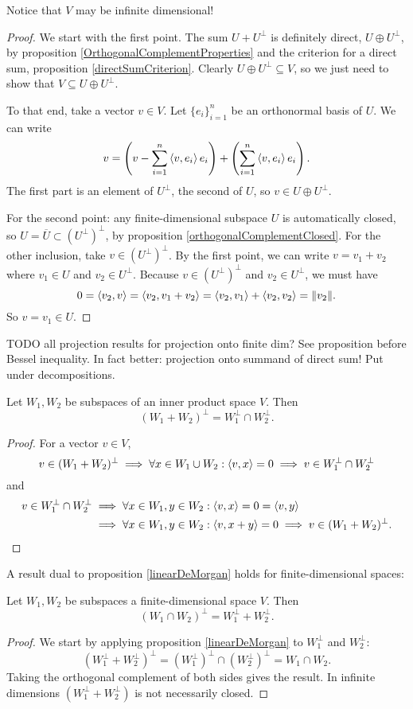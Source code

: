 Notice that $V$ may be infinite dimensional!
\begin{proof}
We start with the first point. The sum $U + U^\perp$ is definitely direct, $U\oplus U^\perp$, by proposition \ref{OrthogonalComplementProperties} and the criterion for a direct sum, proposition \ref{directSumCriterion}. Clearly $U\oplus U^\perp\subseteq V$, so we just need to show that $V \subseteq U\oplus U^\perp$.

To that end, take a vector $v\in V$. Let $\{e_i\}_{i=1}^n$ be an orthonormal basis of $U$. We can write
\[ v = \left(v - \sum_{i=1}^n\left\langle v,e_i \right\rangle e_i\right) + \left(\sum_{i=1}^n\left\langle v,e_i \right\rangle e_i\right). \]
The first part is an element of $U^\perp$, the second of $U$, so $v\in U\oplus U^\perp$.

For the second point: any finite-dimensional subspace $U$ is automatically closed, so $U = \overline{U} \subset (U^\perp)^\perp$, by proposition \ref{orthogonalComplementClosed}. For the other inclusion, take $v\in (U^\perp)^\perp$. By the first point, we can write $v = v_1 + v_2$ where $v_1\in U$ and $v_2\in U^\perp$. Because $v\in (U^\perp)^\perp$ and $v_2\in U^\perp$, we must have
\[ 0 = \left\langle v_2, v \right\rangle = \left\langle v_2, v_1+v_2 \right\rangle = \left\langle v_2, v_1 \right\rangle + \left\langle v_2,v_2 \right\rangle = \lVert v_2\rVert. \]
So $v=v_1\in U$.
\end{proof}

TODO all projection results for projection onto finite dim? See proposition before Bessel inequality. In fact better: projection onto summand of direct sum! Put under decompositions.

\begin{proposition} \label{linearDeMorgan}
Let $W_1,W_2$ be subspaces of an inner product space $V$. Then
\[ (W_1+W_2)^\perp = W_1^\perp \cap W_2^\perp. \]
\end{proposition}
\begin{proof}
For a vector $v\in V$,
\[  v\in (W_1+W_2)^\perp \implies \forall x\in W_1\cup W_2: \left\langle v,x \right\rangle = 0 \implies v\in W_1^\perp \cap W_2^\perp \]
and
\begin{align*}
v\in W_1^\perp \cap W_2^\perp &\implies \forall x\in W_1, y\in W_2: \left\langle v,x \right\rangle = 0 = \left\langle v,y \right\rangle \\
&\implies \forall x\in W_1, y\in W_2:\left\langle v, x+y \right\rangle = 0 \implies v\in (W_1+W_2)^\perp.
\end{align*}
\end{proof}

A result dual to proposition \ref{linearDeMorgan} holds for finite-dimensional spaces:
\begin{proposition}
Let $W_1,W_2$ be subspaces a finite-dimensional space $V$. Then
\[ (W_1\cap W_2)^\perp = W_1^\perp + W_2^\perp. \]
\end{proposition}
\begin{proof}
We start by applying proposition \ref{linearDeMorgan} to $W_1^\perp$ and $W_2^\perp$:
\[ (W_1^\perp+W_2^\perp)^\perp = (W_1^\perp)^\perp \cap (W_2^\perp)^\perp = W_1 \cap W_2. \]
Taking the orthogonal complement of both sides gives the result. In infinite dimensions $(W_1^\perp+W_2^\perp)$ is not necessarily closed. 
\end{proof}


